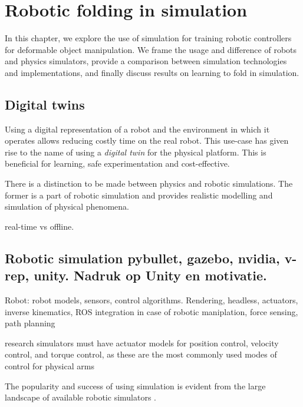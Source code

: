 \documentclass[\home/main.tex]{subfiles}
\begin{document}
\chapter{Robotic folding in simulation}\label{ch:simulation}

In this chapter, we explore the use of simulation for training robotic controllers for deformable object manipulation. We frame the usage and difference of robots and physics simulators, provide a comparison between simulation technologies and implementations, and finally discuss results on learning to fold in simulation. 

\section{Digital twins}

Using a digital representation of a robot and the environment in which it operates allows reducing costly time on the real robot. This use-case has given rise to the name of using a \emph{digital twin} for the physical platform. This is beneficial for learning, safe experimentation and cost-effective. 

There is a distinction to be made between physics and robotic simulations. The former is a part of robotic simulation and provides realistic modelling and simulation of physical phenomena. 

real-time vs offline.


\section{Robotic simulation {\tiny pybullet, gazebo, nvidia, v-rep, unity. Nadruk op Unity en motivatie.}}

Robot: robot models, sensors, control algorithms. 
Rendering, headless, actuators, inverse kinematics, ROS integration 
in case of robotic maniplation, force sensing, path planning    

research simulators must have actuator models for position control, velocity control, and torque control, as these are the most commonly used modes of control for physical arms 


The popularity and success of using simulation is evident from the large landscape of available robotic simulators \autocite{Collins2021}. 
\end{document}
